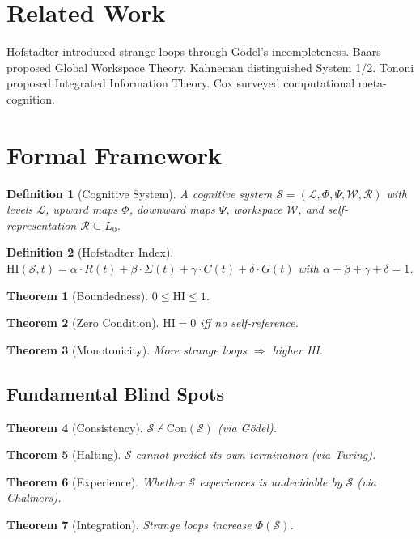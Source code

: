 \documentclass[11pt]{article}
\newtheorem{definition}{Definition}
\newtheorem{theorem}{Theorem}
\begin{document}
\section{Related Work}
\label{sec:related}

Hofstadter \citep{hofstadter1979geb} introduced strange loops through G\"{o}del's incompleteness. Baars \citep{baars1988cognitive} proposed Global Workspace Theory. Kahneman \citep{kahneman2011thinking} distinguished System 1/2. Tononi \citep{tononi2004iit} proposed Integrated Information Theory. Cox \citep{cox2005metacognition} surveyed computational meta-cognition.

\section{Formal Framework}
\label{sec:formal}

\begin{definition}[Cognitive System]
A cognitive system $\mathcal{S} = (\mathcal{L}, \Phi, \Psi, \mathcal{W}, \mathcal{R})$ with levels $\mathcal{L}$, upward maps $\Phi$, downward maps $\Psi$, workspace $\mathcal{W}$, and self-representation $\mathcal{R} \subseteq L_0$.
\end{definition}

\begin{definition}[Hofstadter Index]
$\text{HI}(\mathcal{S}, t) = \alpha \cdot R(t) + \beta \cdot \Sigma(t) + \gamma \cdot C(t) + \delta \cdot G(t)$
with $\alpha + \beta + \gamma + \delta = 1$.
\end{definition}

\begin{theorem}[Boundedness] $0 \leq \text{HI} \leq 1$. \end{theorem}
\begin{theorem}[Zero Condition] $\text{HI} = 0$ iff no self-reference. \end{theorem}
\begin{theorem}[Monotonicity] More strange loops $\Rightarrow$ higher HI. \end{theorem}

\subsection{Fundamental Blind Spots}
\label{sec:blindspots}

\begin{theorem}[Consistency] $\mathcal{S} \nvdash \text{Con}(\mathcal{S})$ (via G\"{o}del). \end{theorem}
\begin{theorem}[Halting] $\mathcal{S}$ cannot predict its own termination (via Turing). \end{theorem}
\begin{theorem}[Experience] Whether $\mathcal{S}$ experiences is undecidable by $\mathcal{S}$ (via Chalmers). \end{theorem}
\begin{theorem}[Integration] Strange loops increase $\Phi(\mathcal{S})$. \end{theorem}
\end{document}
